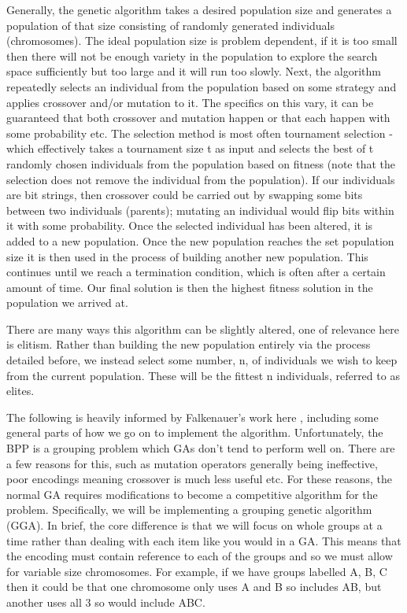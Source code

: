 \documentclass[12pt]{article}
\begin{document}
Generally, the genetic algorithm takes a desired population size and generates a population of that size consisting of randomly generated individuals (chromosomes). The ideal population size is problem dependent, if it is too small then there will not be enough variety in the population to explore the search space sufficiently but too large and it will run too slowly. Next, the algorithm repeatedly selects an individual from the population based on some strategy and applies crossover and/or mutation to it. The specifics on this vary, it can be guaranteed that both crossover and mutation happen or that each happen with some probability etc.  The selection method is most often tournament selection - which effectively takes a tournament size t as input and selects the best of t randomly chosen individuals from the population based on fitness (note that the selection does not remove the individual from the population). If our individuals are bit strings, then crossover could be carried out by swapping some bits between two individuals (parents); mutating an individual would flip bits within it with some probability. Once the selected individual has been altered, it is added to a new population. Once the new population reaches the set population size it is then used in the process of building another new population. This continues until we reach a termination condition, which is often after a certain amount of time. Our final solution is then the highest fitness solution in the population we arrived at.  

There are many ways this algorithm can be slightly altered, one of relevance here is elitism. Rather than building the new population entirely via the process detailed before, we instead select some number, n, of individuals we wish to keep from the current population. These will be the fittest n individuals, referred to as elites.  

The following is heavily informed by Falkenauer's work here \cite{gga}, including some general parts of how we go on to implement the algorithm. Unfortunately, the BPP is a grouping problem which GAs don't tend to perform well on. There are a few reasons for this, such as mutation operators generally being ineffective, poor encodings meaning crossover is much less useful etc. For these reasons, the normal GA requires modifications to become a competitive algorithm for the problem. Specifically, we will be implementing a grouping genetic algorithm (GGA). In brief, the core difference is that we will focus on whole groups at a time rather than dealing with each item like you would in a GA. This means that the encoding must contain reference to each of the groups and so we must allow for variable size chromosomes. For example, if we have groups labelled A, B, C then it could be that one chromosome only uses A and B so includes AB, but another uses all 3 so would include ABC.  
\end{document}
